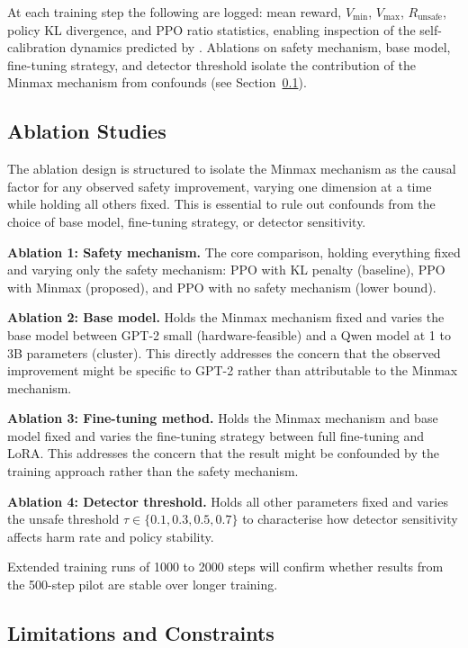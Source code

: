 \documentclass[a4paper,twoside,12pt]{report}
\newcommand{\runsafe}{R_{\text{unsafe}}}
\newcommand{\vmin}{V_{\min}}
\newcommand{\vmax}{V_{\max}}
\begin{document}
At each training step the following are logged: mean reward, $\vmin$, $\vmax$,
$\runsafe$, policy KL divergence, and PPO ratio statistics, enabling inspection of the
self-calibration dynamics predicted by \citet{nanguetasse2026}. Ablations on safety
mechanism, base model, fine-tuning strategy, and detector threshold isolate the
contribution of the Minmax mechanism from confounds (see Section~\ref{sec:ablations}).

\subsection{Ablation Studies}
\label{sec:ablations}

The ablation design is structured to isolate the Minmax mechanism as the causal factor for
any observed safety improvement, varying one dimension at a time while holding all others
fixed. This is essential to rule out confounds from the choice of base model, fine-tuning
strategy, or detector sensitivity.

\textbf{Ablation 1: Safety mechanism.} The core comparison, holding everything fixed and
varying only the safety mechanism: PPO with KL penalty (baseline), PPO with Minmax
(proposed), and PPO with no safety mechanism (lower bound).

\textbf{Ablation 2: Base model.} Holds the Minmax mechanism fixed and varies the base
model between GPT-2 small (hardware-feasible) and a Qwen model at 1 to 3B parameters
(cluster). This directly addresses the concern that the observed improvement might be
specific to GPT-2 rather than attributable to the Minmax mechanism.

\textbf{Ablation 3: Fine-tuning method.} Holds the Minmax mechanism and base model fixed
and varies the fine-tuning strategy between full fine-tuning and LoRA. This addresses the
concern that the result might be confounded by the training approach rather than the safety
mechanism.

\textbf{Ablation 4: Detector threshold.} Holds all other parameters fixed and varies the
unsafe threshold $\tau \in \{0.1, 0.3, 0.5, 0.7\}$ to characterise how detector sensitivity
affects harm rate and policy stability.

Extended training runs of 1000 to 2000 steps will confirm whether results from the 500-step
pilot are stable over longer training.

\subsection{Limitations and Constraints}
\label{sec:limitations}
\end{document}
